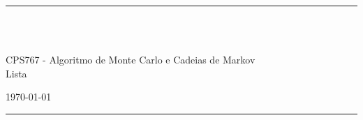 \fancyhead[C]{}
\hrule \medskip
\begin{minipage}{0.295\textwidth} 
\raggedright
\footnotesize
\yourname \hfill\\ 
\yournetid \hfill\\ 
\youremail
\end{minipage}
\begin{minipage}{0.4\textwidth} 
\centering 
\large 
CPS767 - Algoritmo de Monte Carlo e Cadeias de Markov \\ 
\normalsize 
Lista \assignmentnumber\\ 
\end{minipage}
\begin{minipage}{0.295\textwidth} 
\raggedleft
\today\hfill\\
\end{minipage}
\medskip\hrule 
\bigskip
